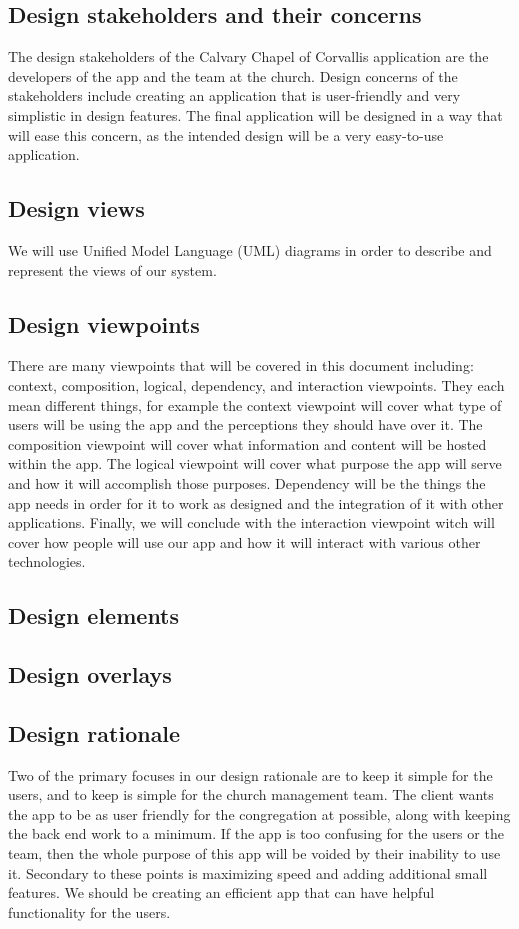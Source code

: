 \documentclass[letterpaper,10pt,draftclsnofoot,onecolumn,titlepage]{IEEEtran}
\begin{document}
		\subsection{Design stakeholders and their concerns}
			The design stakeholders of the Calvary Chapel of Corvallis application are the developers of the app and the team at the church.
			Design concerns of the stakeholders include creating an application that is user-friendly and very simplistic in design features.
			The final application will be designed in a way that will ease this concern, as the intended design will be a very easy-to-use application.

		\subsection{Design views}
		We will use Unified Model Language (UML) diagrams in order to describe and represent the views of our system.

		\subsection{Design viewpoints}
		There are many viewpoints that will be covered in this document including: context, composition, logical, dependency, and interaction viewpoints.
		They each mean different things, for example the context viewpoint will cover what type of users will be using the app and the perceptions they should have over it.
		The composition viewpoint will cover what information and content will be hosted within the app.
		The logical viewpoint will cover what purpose the app will serve and how it will accomplish those purposes.
		Dependency will be the things the app needs in order for it to work as designed and the integration of it with other applications.
		Finally, we will conclude with the interaction viewpoint witch will cover how people will use our app and how it will interact with various other technologies.

		\subsection{Design elements}

		\subsection{Design overlays}

		\subsection{Design rationale}
		Two of the primary focuses in our design rationale are to keep it simple for the users, and to keep is simple for the church management team.
		The client wants the app to be as user friendly for the congregation at possible, along with keeping the back end work to a minimum.
		If the app is too confusing for the users or the team, then the whole purpose of this app will be voided by their inability to use it.
		Secondary to these points is maximizing speed and adding additional small features.
		We should be creating an efficient app that can have helpful functionality for the users.
\end{document}

